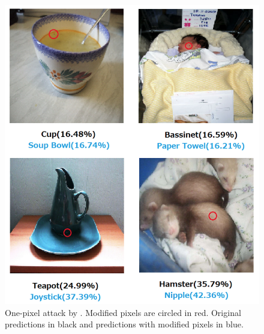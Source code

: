 \begin{figure}[!htb]
    \centering
    \includegraphics[width=.6\linewidth]{Figures/intro/su_one_pixel.png}
    \caption{ One-pixel attack by \cite{su_one_2019}. Modified pixels are
        circled in red. Original predictions in black and predictions with
        modified pixels in blue.}
    \label{fig:su_one_pixel}
\end{figure}

